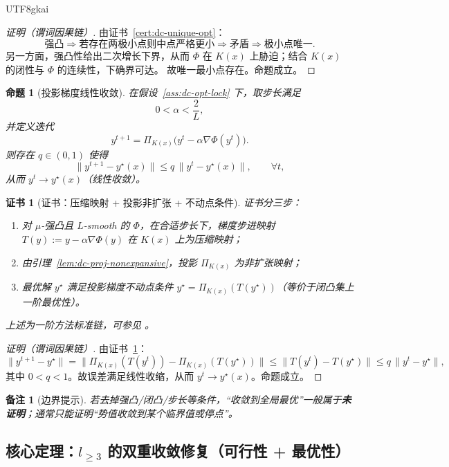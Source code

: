 \documentclass[12pt]{article}
\newtheorem{proposition}{命题}[section]
\newtheorem{remark}{备注}[section]
\newtheorem{Certificate}{证书}[section]
\begin{document}
\begin{CJK*}{UTF8}{gkai}
\begin{proof}[证明（谓词因果链）]
由证书~\ref{cert:dc-unique-opt}：
\[
\text{强凸}\Rightarrow \text{若存在两极小点则中点严格更小}\Rightarrow \text{矛盾}\Rightarrow \text{极小点唯一}.
\]
另一方面，强凸性给出二次增长下界，从而 $\Phi$ 在 $K(x)$ 上胁迫；结合 $K(x)$ 的闭性与 $\Phi$ 的连续性，下确界可达。
故唯一最小点存在。命题成立。
\end{proof}

\begin{proposition}[投影梯度线性收敛]\label{prop:dc-pgd-linear}
在假设~\ref{ass:dc-opt-lock} 下，取步长满足
\[
0<\alpha<\frac{2}{L},
\]
并定义迭代
\[
y^{t+1}=\Pi_{K(x)}\bigl(y^t-\alpha\nabla\Phi(y^t)\bigr).
\]
则存在 $q\in(0,1)$ 使得
\[
\|y^{t+1}-y^\star(x)\|\le q\,\|y^{t}-y^\star(x)\|,\qquad \forall t,
\]
从而 $y^{t}\to y^\star(x)$（线性收敛）。
\end{proposition}

\begin{Certificate}[证书：压缩映射 + 投影非扩张 + 不动点条件]\label{cert:dc-pgd-linear}
证书分三步：
\begin{enumerate}
\item 对 $\mu$-强凸且 $L$-smooth 的 $\Phi$，在合适步长下，梯度步进映射 $T(y):=y-\alpha\nabla\Phi(y)$ 在 $K(x)$ 上为压缩映射；
\item 由引理~\ref{lem:dc-proj-nonexpansive}，投影 $\Pi_{K(x)}$ 为非扩张映射；
\item 最优解 $y^\star$ 满足投影梯度不动点条件 $y^\star=\Pi_{K(x)}(T(y^\star))$（等价于闭凸集上一阶最优性）。
\end{enumerate}
上述为一阶方法标准链，可参见 \cite{Nesterov2004,Beck2017,BauschkeCombettes2017}。
\end{Certificate}

\begin{proof}[证明（谓词因果链）]
由证书~\ref{cert:dc-pgd-linear}：
\[
\|y^{t+1}-y^\star\|
=\|\Pi_{K(x)}(T(y^t))-\Pi_{K(x)}(T(y^\star))\|
\le \|T(y^t)-T(y^\star)\|
\le q\,\|y^t-y^\star\|,
\]
其中 $0<q<1$。故误差满足线性收缩，从而 $y^t\to y^\star(x)$。命题成立。
\end{proof}

\begin{remark}[边界提示]
若去掉强凸/闭凸/步长等条件，“收敛到全局最优”一般属于\textbf{未证明}；通常只能证明“势值收敛到某个临界值或停点”。
\end{remark}

\subsection{核心定理：$l_{\ge 3}$ 的双重收敛修复（可行性 + 最优性）}
\label{subsec:double-convergence-main-theorem}


\end{CJK*}
\end{document}
